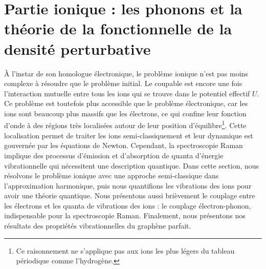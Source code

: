 \section{Partie ionique : les phonons et la théorie de la fonctionnelle de la densité perturbative}\label{sec:phonons}
À l'instar de son homologue électronique, le problème ionique n'est pas moins complexe à résoudre que le problème initial. Le coupable est encore une fois l'interaction mutuelle entre tous les ions qui se trouve dans le potentiel effectif $U$. Ce problème est toutefois plus accessible que le problème électronique, car les ions sont beaucoup plus massifs que les électrons, ce qui confine leur fonction d'onde à des régions très localisées autour de leur position d'équilibre\footnote{Ce raisonnement ne s'applique pas aux ions les plus légers du tableau périodique comme l'hydrogène.}. Cette localisation permet de traiter les ions semi-classiquement et leur dynamique est gouvernée par les équations de Newton. Cependant, la spectroscopie Raman implique des processus d'émission et d'absorption de quanta d'énergie vibrationnelle qui nécessitent une description quantique. Dans cette section, nous résolvons le problème ionique avec une approche semi-classique dans l'approximation harmonique, puis nous quantifions les vibrations des ions pour avoir une théorie quantique. Nous présentons aussi brièvement le couplage entre les électrons et les quanta de vibrations des ions : le couplage électron-phonon, indispensable pour la spectroscopie Raman. Finalement, nous présentons nos résultats des propriétés vibrationnelles du graphène parfait.

